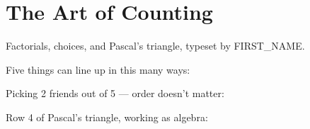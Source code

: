 
\section{The Art of Counting}

Factorials, choices, and Pascal's triangle, typeset by {{FIRST_NAME}}.

Five things can line up in this many ways:



Picking 2 friends out of 5 — order doesn't matter:



Row 4 of Pascal's triangle, working as algebra:


